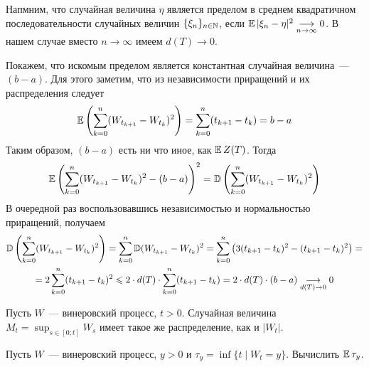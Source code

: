\begin{solution}
    Напмним, что случайная величина $ \eta $ является пределом в среднем квадратичном последовательности случайных величин $ \{ \xi_n \}_{n \in \mathbb{N}} $,
    если $ \operatorname{\mathbb{E}} |\xi_n - \eta|^2 \underset{n \to \infty}{\longrightarrow} 0 $.
    В нашем случае вместо $ n \to \infty $ имеем $ d(T) \to 0 $.

    Покажем, что искомым пределом является константная случайная величина~--- $ (b - a) $.
    Для этого заметим, что из независимости приращений и их распределения следует
    \[
        \operatorname{\mathbb{E}} \left( \sum_{k=0}^n (W_{t_{k+1}} - W_{t_k})^2 \right) = \sum_{k=0}^n (t_{k+1} - t_k) = b - a
    \]
    Таким образом, $ (b - a) $ есть ни что иное, как $ \operatorname{\mathbb{E}} Z(T) $.
    Тогда
    \[
        \operatorname{\mathbb{E}} \left( \sum_{k=0}^n (W_{t_{k+1}} - W_{t_k})^2 - (b - a) \right)^2 = \operatorname{\mathbb{D}} \left( \sum_{k=0}^n (W_{t_{k+1}} - W_{t_k})^2 \right)
    \]
    В очередной раз воспользовавшись независимостью и нормальностью приращений, получаем
    \begin{multline*}
        \operatorname{\mathbb{D}} \left( \sum_{k=0}^n (W_{t_{k+1}} - W_{t_k})^2 \right) = \sum_{k=0}^n \operatorname{\mathbb{D}} (W_{t_{k+1}} - W_{t_k})^2 = \sum_{k=0}^n \left( 3 (t_{k+1} - t_k)^2 - (t_{k+1} - t_{k})^2 \right) = \\
        = 2 \sum_{k=0}^n (t_{k+1} - t_k)^2 \leqslant 2 \cdot d(T) \cdot \sum_{k=0}^n (t_{k+1} - t_k) = 2 \cdot d(T) \cdot (b - a) \underset{d(T) \to 0}{\longrightarrow} 0
    \end{multline*}
\end{solution}


\begin{theorem}[Башелье]
    \label{theorem:special:Bachelier_theorem}
    Пусть $ W $~--- винеровский процесс, $ t > 0 $.
    Случайная величина $ M_t = \sup_{s \in [0; t]} W_s $ имеет такое же распределение, как и $ |W_t| $.
\end{theorem}


\begin{exercise}
    \label{exercise:special:Wiener_process_reach_point_time_expectation}
    Пусть $ W $~--- винеровский процесс, $ y > 0 $ и $ \tau_y = \inf \{ t \mid W_t = y \} $.
    Вычислить $ \operatorname{\mathbb{E}} \tau_y $.
\end{exercise}

